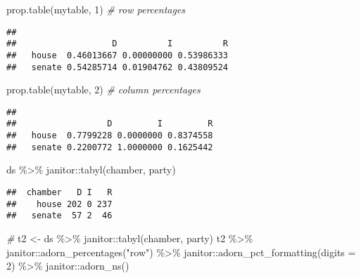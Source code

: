 \documentclass[
]{book}
\newenvironment{Shaded}{\begin{snugshade}}{\end{snugshade}}
\newcommand{\AttributeTok}[1]{\textcolor[rgb]{0.77,0.63,0.00}{#1}}
\newcommand{\CommentTok}[1]{\textcolor[rgb]{0.56,0.35,0.01}{\textit{#1}}}
\newcommand{\DecValTok}[1]{\textcolor[rgb]{0.00,0.00,0.81}{#1}}
\newcommand{\FunctionTok}[1]{\textcolor[rgb]{0.00,0.00,0.00}{#1}}
\newcommand{\NormalTok}[1]{#1}
\newcommand{\OtherTok}[1]{\textcolor[rgb]{0.56,0.35,0.01}{#1}}
\newcommand{\SpecialCharTok}[1]{\textcolor[rgb]{0.00,0.00,0.00}{#1}}
\newcommand{\StringTok}[1]{\textcolor[rgb]{0.31,0.60,0.02}{#1}}
\begin{document}
\begin{Shaded}
\begin{Highlighting}[]
\FunctionTok{prop.table}\NormalTok{(mytable, }\DecValTok{1}\NormalTok{) }\CommentTok{\# row percentages}
\end{Highlighting}
\end{Shaded}

\begin{verbatim}
##         
##                   D          I          R
##   house  0.46013667 0.00000000 0.53986333
##   senate 0.54285714 0.01904762 0.43809524
\end{verbatim}

\begin{Shaded}
\begin{Highlighting}[]
\FunctionTok{prop.table}\NormalTok{(mytable, }\DecValTok{2}\NormalTok{) }\CommentTok{\# column percentages}
\end{Highlighting}
\end{Shaded}

\begin{verbatim}
##         
##                  D         I         R
##   house  0.7799228 0.0000000 0.8374558
##   senate 0.2200772 1.0000000 0.1625442
\end{verbatim}

\begin{Shaded}
\begin{Highlighting}[]
\NormalTok{ds }\SpecialCharTok{\%\textgreater{}\%}\NormalTok{  janitor}\SpecialCharTok{::}\FunctionTok{tabyl}\NormalTok{(chamber, party)}
\end{Highlighting}
\end{Shaded}

\begin{verbatim}
##  chamber   D I   R
##    house 202 0 237
##   senate  57 2  46
\end{verbatim}

\begin{Shaded}
\begin{Highlighting}[]
\CommentTok{\#}
\NormalTok{t2 }\OtherTok{\textless{}{-}}\NormalTok{ ds }\SpecialCharTok{\%\textgreater{}\%}\NormalTok{  janitor}\SpecialCharTok{::}\FunctionTok{tabyl}\NormalTok{(chamber, party)}
\NormalTok{t2 }\SpecialCharTok{\%\textgreater{}\%}
\NormalTok{  janitor}\SpecialCharTok{::}\FunctionTok{adorn\_percentages}\NormalTok{(}\StringTok{"row"}\NormalTok{) }\SpecialCharTok{\%\textgreater{}\%}
\NormalTok{  janitor}\SpecialCharTok{::}\FunctionTok{adorn\_pct\_formatting}\NormalTok{(}\AttributeTok{digits =} \DecValTok{2}\NormalTok{) }\SpecialCharTok{\%\textgreater{}\%}
\NormalTok{  janitor}\SpecialCharTok{::}\FunctionTok{adorn\_ns}\NormalTok{()}
\end{Highlighting}
\end{Shaded}
\end{document}
